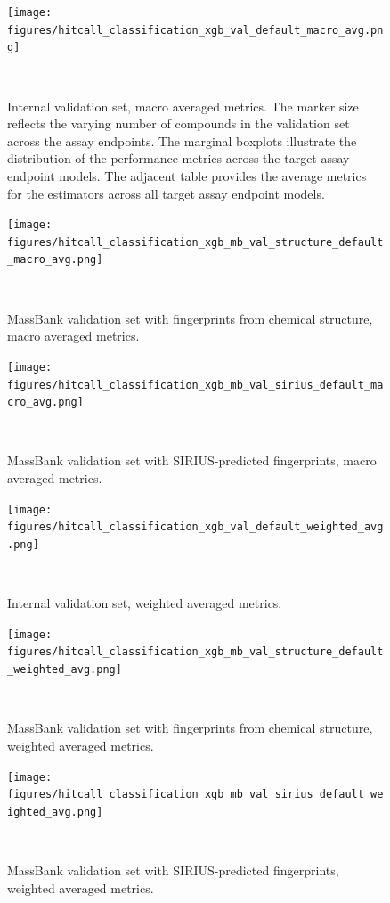 \begin{figure}
  \centering
  \texttt{[image: figures/hitcall\_classification\_xgb\_val\_default\_macro\_avg.png]}
  \caption{Internal validation set, macro averaged metrics. The marker size reflects the varying number of compounds in the validation set across the assay endpoints. The marginal boxplots illustrate the distribution of the performance metrics across the target assay endpoint models. The adjacent table provides the average metrics for the estimators across all target assay endpoint models.}
~\label{fig:hitcall_classification_xgb_val_default_macro_avg}
\end{figure}

\begin{figure}
  \centering
  \texttt{[image: figures/hitcall\_classification\_xgb\_mb\_val\_structure\_default\_macro\_avg.png]}
  \caption{MassBank validation set with fingerprints from chemical structure, macro averaged metrics.}
~\label{fig:hitcall_classification_xgb_mb_val_structure_default_macro_avg}
\end{figure}

\begin{figure}
  \centering
  \texttt{[image: figures/hitcall\_classification\_xgb\_mb\_val\_sirius\_default\_macro\_avg.png]}
  \caption{MassBank validation set with SIRIUS-predicted fingerprints, macro averaged metrics.}
~\label{fig:hitcall_classification_xgb_mb_val_sirius_default_macro_avg}
\end{figure}

\begin{figure}
  \centering
  \texttt{[image: figures/hitcall\_classification\_xgb\_val\_default\_weighted\_avg.png]}
  \caption{Internal validation set, weighted averaged metrics.}
~\label{fig:hitcall_classification_xgb_val_default_weighted_avg}
\end{figure}

\begin{figure}
  \centering
  \texttt{[image: figures/hitcall\_classification\_xgb\_mb\_val\_structure\_default\_weighted\_avg.png]}
  \caption{MassBank validation set with fingerprints from chemical structure, weighted averaged metrics.}
~\label{fig:hitcall_classification_xgb_mb_val_structure_default_weighted_avg}
\end{figure}

\begin{figure}
  \centering
  \texttt{[image: figures/hitcall\_classification\_xgb\_mb\_val\_sirius\_default\_weighted\_avg.png]}
  \caption{MassBank validation set with SIRIUS-predicted fingerprints, weighted averaged metrics.}
~\label{fig:hitcall_classification_xgb_mb_val_sirius_default_weighted_avg}
\end{figure}


